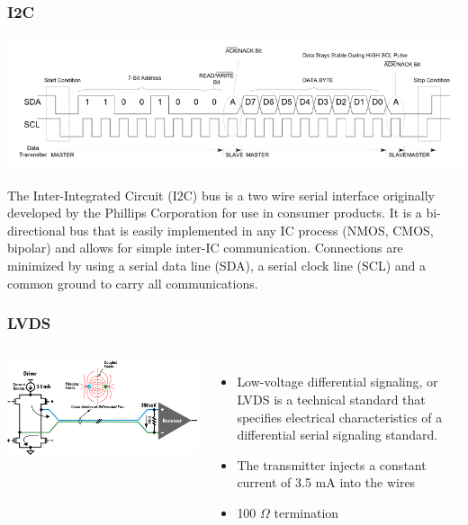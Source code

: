 \documentclass[aspectratio=169]{beamer}
\begin{document}
	\begin{frame}[noframenumbering]
		\frametitle{I2C}
		\begin{center}
			\includegraphics[width=0.8 \textwidth]{IMG/I2C.png}
		\end{center}
		The Inter-Integrated Circuit (I2C) bus is a two wire serial interface originally developed by the Phillips Corporation for use in consumer products. It is a bi-directional bus that is easily implemented in any IC process (NMOS, CMOS, bipolar) and allows for simple inter-IC communication. Connections are minimized by using a serial data line (SDA), a serial clock line (SCL) and a common ground to carry all communications.
	\end{frame}

	\begin{frame}[noframenumbering]
		\frametitle{LVDS}
		\begin{columns}
			\begin{center}
				\includegraphics[width=0.95 \textwidth]{IMG/LVDS.png}
			\end{center}
			\begin{itemize}
				\item Low-voltage differential signaling, or LVDS is a technical standard that specifies electrical characteristics of a differential serial signaling standard.
				\item The transmitter injects a constant current of 3.5 mA into the wires
				\item 100 $\Omega$ termination
			\end{itemize}
		\end{columns}
	\end{frame}
\end{document}
